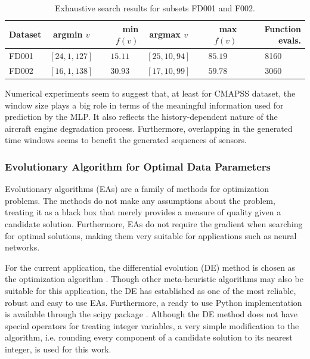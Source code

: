 \documentclass[preprint,12pt]{elsarticle}%
\begin{document}
\begin{table}[!htb]
\begin{center}
\begin{tabular}
[c]{l|crcrr}\hline
Dataset & argmin $v$ & min $f(v)$ & argmax $v$ & max $f(v)$ & Function evals.\\\hline
FD001 & $\left[  24,1,127\right]  $ & \multicolumn{1}{c}{$15.11$} & $\left[25,10,94\right]  $ & \multicolumn{1}{c}{$85.19$} & \multicolumn{1}{c}{8160}\\
FD002 & $\left[  16,1,138\right]  $ & \multicolumn{1}{c}{$30.93$} & $\left[17,10,99\right]  $ & \multicolumn{1}{c}{$59.78$} & \multicolumn{1}{c}{3060}\\\hline
\end{tabular}
\caption{Exhaustive search results for subsets FD001 and F002.}
\label{table:true_optimal_data_params}
\end{center}
\end{table}

Numerical experiments seem to suggest that, at least for CMAPSS dataset, the window size plays a big role in terms of the meaningful information used for prediction by the MLP. It also reflects the history-dependent nature of the aircraft engine degradation process. 
Furthermore, overlapping in the generated time windows seems to benefit the generated sequences of sensors.

\subsubsection{Evolutionary Algorithm for Optimal Data Parameters}

\label{sec:ea_optimization_process}

Evolutionary algorithms (EAs) are a family of methods for optimization
problems. The methods do not make any assumptions about the problem, treating
it as a black box that merely provides a measure of quality given a candidate
solution. Furthermore, EAs do not require the gradient when searching for
optimal solutions, making them very suitable for applications such as neural networks.

For the current application, the differential evolution (DE) method is chosen
as the optimization algorithm \cite{Storn1997}. Though other meta-heuristic
algorithms may also be suitable for this application, the DE has
established as one of the most reliable, robust and easy to use EAs.
Furthermore, a ready to use Python implementation is available through the
scipy package \cite{scipy}. Although the DE method does not have special
operators for treating integer variables, a very simple modification to the
algorithm, i.e. rounding every component of a candidate solution to its
nearest integer, is used for this work.
\end{document}
